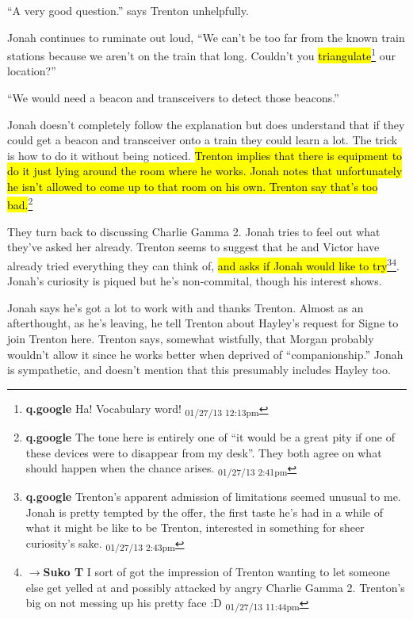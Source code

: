 ``A very good question.'' says Trenton unhelpfully.

Jonah continues to ruminate out loud, ``We can't be too far from the known train stations because we aren't on the train that long.  Couldn't you \hl{triangulate}\footnote{\textbf{q.google }Ha!  Vocabulary word! \textsubscript{01/27/13 12:13pm}} our location?''

``We would need a beacon and transceivers to detect those beacons.''

Jonah doesn't completely follow the explanation but does understand that if they could get a beacon and transceiver onto a train they could learn a lot.  The trick is how to do it without being noticed.  \hl{Trenton implies that there is equipment to do it just lying around the room where he works.  Jonah notes that unfortunately he isn't allowed to come up to that room on his own.  Trenton say that's too bad.}\footnote{\textbf{q.google }The tone here is entirely one of ``it would be a great pity if one of these devices were to disappear from my desk''.  They both agree on what should happen when the chance arises. \textsubscript{01/27/13 2:41pm}}

They turn back to discussing Charlie Gamma 2.  Jonah tries to feel out what they've asked her already.  Trenton seems to suggest that he and Victor have already tried everything they can think of, \hl{and asks if Jonah would like to try}\footnote{\textbf{q.google }Trenton's apparent admission of limitations seemed unusual to me.  Jonah is pretty tempted by the offer, the first taste he's had in a while of what it might be like to be Trenton, interested in something for sheer curiosity's sake. \textsubscript{01/27/13 2:43pm}}\footnote{$\rightarrow$\textbf{Suko T }I sort of got the impression of Trenton wanting to let someone else get yelled at and possibly attacked by angry Charlie Gamma 2.  Trenton's big on not messing up his pretty face :D \textsubscript{01/27/13 11:44pm}}.  Jonah's curiosity is piqued but he's non-commital, though his interest shows.

Jonah says he's got a lot to work with and thanks Trenton.  Almost as an afterthought, as he's leaving, he tell Trenton about Hayley's request for Signe to join Trenton here.  Trenton says, somewhat wistfully, that Morgan probably wouldn't allow it since he works better when deprived of ``companionship.''  Jonah is sympathetic, and doesn't mention that this presumably includes Hayley too.



